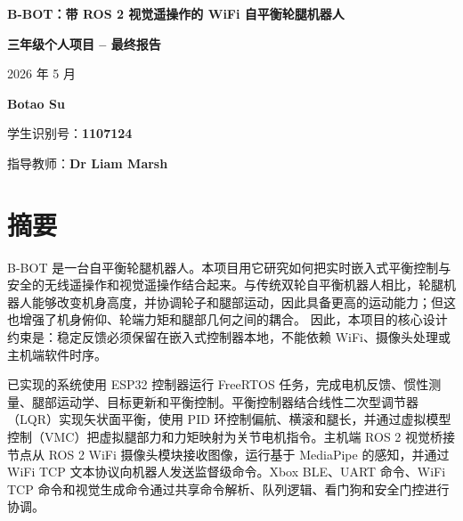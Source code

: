 \documentclass[12pt, a4paper]{article}
\begin{document}
\hypersetup{pageanchor=false}

\begin{titlepage}
    \centering
    \vspace*{2cm}
    {\fontsize{24pt}{28pt}\selectfont \textbf{B-BOT：带 ROS 2 视觉遥操作的 WiFi 自平衡轮腿机器人}\par}
    \vspace{2cm}
    {\Large \textbf{三年级个人项目 -- 最终报告}\par}
    \vspace{1cm}
    {\large 2026 年 5 月\par}
    \vspace{3cm}
    {\large \textbf{Botao Su}\par}
    \vspace{0.5cm}
    {\large 学生识别号：\textbf{1107124}\par}
    \vspace{3cm}
    {\large 指导教师：\textbf{Dr Liam Marsh}\par}
    \vfill
\end{titlepage}
\hypersetup{pageanchor=true}

\newpage
\section*{摘要}
B-BOT 是一台自平衡轮腿机器人。本项目用它研究如何把实时嵌入式平衡控制与安全的无线遥操作和视觉遥操作结合起来。与传统双轮自平衡机器人相比，轮腿机器人能够改变机身高度，并协调轮子和腿部运动，因此具备更高的运动能力；但这也增强了机身俯仰、轮端力矩和腿部几何之间的耦合。 因此，本项目的核心设计约束是：稳定反馈必须保留在嵌入式控制器本地，不能依赖 WiFi、摄像头处理或主机端软件时序。

已实现的系统使用 ESP32 控制器运行 FreeRTOS 任务，完成电机反馈、惯性测量、腿部运动学、目标更新和平衡控制。平衡控制器结合线性二次型调节器（LQR）实现矢状面平衡，使用 PID 环控制偏航、横滚和腿长，并通过虚拟模型控制（VMC）把虚拟腿部力和力矩映射为关节电机指令。主机端 ROS 2 视觉桥接节点从 ROS 2 WiFi 摄像头模块接收图像，运行基于 MediaPipe 的感知，并通过 WiFi TCP 文本协议向机器人发送监督级命令。Xbox BLE、UART 命令、WiFi TCP 命令和视觉生成命令通过共享命令解析、队列逻辑、看门狗和安全门控进行协调。
\end{document}
